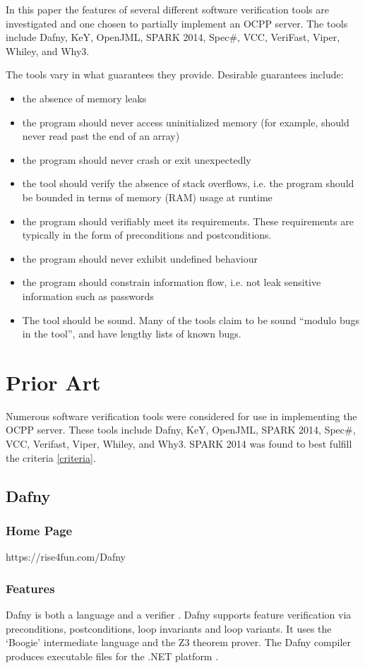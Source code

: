 \documentclass[12pt,openany,a4paper]{book}
\begin{document}
In this paper the features of several different software verification tools are investigated and one chosen to partially implement an OCPP server. The tools include Dafny, KeY, OpenJML, SPARK 2014, Spec\#, VCC, VeriFast, Viper, Whiley, and Why3.

The tools vary in what guarantees they provide. Desirable guarantees include: 
\label{criteria}
\begin{itemize}
	\item the absence of memory leaks
	\item the program should never access uninitialized memory (for example, should never read past the end of an array)
	\item the program should never crash or exit unexpectedly
	\item the tool should verify the absence of stack overflows, i.e. the program should be bounded in terms of memory (RAM) usage at runtime
	\item the program should verifiably meet its requirements. These requirements are typically in the form of preconditions and postconditions.
	\item the program should never exhibit undefined behaviour
	\item the program should constrain information flow, i.e. not leak sensitive information such as passwords
	\item The tool should be sound. Many of the tools claim to be sound ``modulo bugs in the tool'', and have lengthy lists of known bugs. 
\end{itemize}

\chapter{Prior Art}

Numerous software verification tools were considered for use in implementing the OCPP server. These tools include Dafny, KeY, OpenJML, SPARK 2014, Spec\#, VCC, Verifast, Viper, Whiley, and Why3. SPARK 2014 was found to best fulfill the criteria \ref{criteria}.

\section{Dafny}
	\subsection{Home Page}%
		https://rise4fun.com/Dafny
	\subsection{Features}
		Dafny is both a language and a verifier \cite{LeinoK.R.M.2010DAap}. Dafny supports feature verification via preconditions, postconditions, loop invariants and loop variants. It uses the `Boogie' intermediate language and the Z3 theorem prover. The Dafny compiler produces executable files for the .NET platform \cite{dafny02}.
\end{document}
